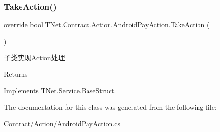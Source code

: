 \subsubsection{\texorpdfstring{Take\+Action()}{TakeAction()}}
{\footnotesize\ttfamily override bool T\+Net.\+Contract.\+Action.\+Android\+Pay\+Action.\+Take\+Action (\begin{DoxyParamCaption}{ }\end{DoxyParamCaption})\hspace{0.3cm}{\ttfamily [virtual]}}



子类实现\+Action处理 

\begin{DoxyReturn}{Returns}

\end{DoxyReturn}


Implements \mbox{\hyperlink{class_t_net_1_1_service_1_1_base_struct_a5a1250b74d925d42066aebdefa36f54a}{T\+Net.\+Service.\+Base\+Struct}}.



The documentation for this class was generated from the following file\+:\begin{DoxyCompactItemize}
\item 
Contract/\+Action/Android\+Pay\+Action.\+cs\end{DoxyCompactItemize}

